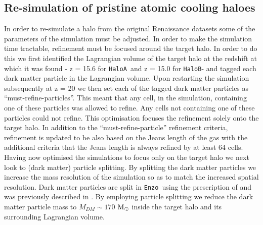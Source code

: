 \documentclass[graphics, twocolumn, usenatbib]{mn2e}
\newcommand{\enzo}{\texttt{Enzo~}}
\newcommand{\msolar} {$\rm{M_{\odot}}~$}
\newcommand{\ha} {\texttt{HaloA~}}
\newcommand{\hbc} {\texttt{HaloB}}
\begin{document}
 \subsection{Re-simulation of pristine atomic cooling haloes} \label{Sec:Resimulation}
 In order to re-simulate a halo from the original Renaissance datasets some of the parameters of the
 simulation  must be adjusted. In order to make the simulation time tractable, refinement
 must be focused around the target halo. In order to do this we first identified the Lagrangian
 volume of the target halo at the redshift at which it was found - z = 15.6 for \ha and z = 15.0
 for \hbc - and tagged each dark matter particle in the Lagrangian volume. Upon restarting
 the simulation subsequently at z = 20 we then set each of the tagged dark matter particles as
 ``must-refine-particles''. This meant that any cell, in the simulation, containing one of these
 particles was allowed to refine. Any cells not containing one of these particles could not refine.
 This optimisation focuses the refinement solely onto the target halo. In addition to the ``must-refine-particle'' refinement criteria,  refinement is updated to be also based on the Jeans length of the
 gas with the additional criteria that the Jeans length is always refined by at least 64 cells. \\ 
 \indent Having now optimised the simulations to focus only on the target halo 
 we next look to (dark matter) particle splitting. By splitting the dark matter
 particles we increase the mass resolution of the simulation so as to match the increased spatial resolution. Dark matter particles are split in \enzo using the prescription of \cite{Kitsionas_2002} and was previously described in \cite{Regan_2015}. By employing particle splitting we reduce the dark matter particle mass to $M_{DM} \sim 170$ \msolar inside the target halo and its surrounding Lagrangian volume.
 
\end{document}
